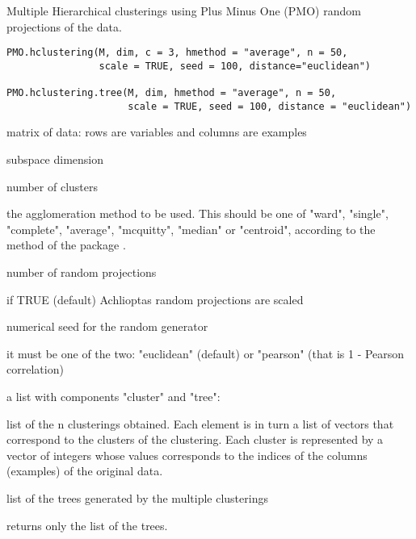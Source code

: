 \documentclass{article}
\begin{document}
\begin{Description}\relax
Multiple Hierarchical clusterings using Plus Minus One (PMO) random projections of the data.
\end{Description}
\begin{Usage}
\begin{verbatim}
PMO.hclustering(M, dim, c = 3, hmethod = "average", n = 50, 
                scale = TRUE, seed = 100, distance="euclidean")

PMO.hclustering.tree(M, dim, hmethod = "average", n = 50, 
                     scale = TRUE, seed = 100, distance = "euclidean")
\end{verbatim}
\end{Usage}
\begin{Arguments}
\begin{ldescription}
\item[\code{M}] matrix of data: rows are variables and columns are examples 
\item[\code{dim}] subspace dimension 
\item[\code{c}] number of clusters 
\item[\code{hmethod}] the agglomeration method to be used. This should be one of 
"ward", "single", "complete", "average", "mcquitty", "median" or "centroid", 
according to the 
method of the package . 
\item[\code{n}] number of  random projections 
\item[\code{scale}] if TRUE (default) Achlioptas random projections are scaled 
\item[\code{seed}] numerical seed for the random generator 
\item[\code{distance}] it must be one of the two: "euclidean" (default) or "pearson" (that is 1 - Pearson correlation) 
\end{ldescription}
\end{Arguments}
\begin{Value}
a list with components "cluster" and "tree":
\begin{ldescription}
\item[\code{cluster }] list of the n clusterings obtained. Each element is in turn a list of vectors that correspond 
to the clusters of the clustering. Each cluster is represented by a vector of integers whose values corresponds to 
the indices of the columns (examples) of the original data. 
\item[\code{tree }] list of the trees generated by the multiple clusterings
\end{ldescription}


 returns only the list of the trees.
\end{Value}
\end{document}
